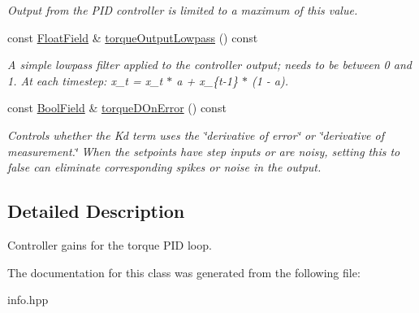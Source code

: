 \begin{DoxyCompactItemize}
\begin{DoxyCompactList}\small\item\em Output from the P\+ID controller is limited to a maximum of this value. \end{DoxyCompactList}\item 
const \hyperlink{classhebi_1_1Info_1_1FloatField}{Float\+Field} \& \hyperlink{classhebi_1_1Info_1_1Settings_1_1Actuator_1_1TorqueGains_ad1d43336c922f567cbb8f1d2f5e1b159}{torque\+Output\+Lowpass} () const \hypertarget{classhebi_1_1Info_1_1Settings_1_1Actuator_1_1TorqueGains_ad1d43336c922f567cbb8f1d2f5e1b159}{}\label{classhebi_1_1Info_1_1Settings_1_1Actuator_1_1TorqueGains_ad1d43336c922f567cbb8f1d2f5e1b159}

\begin{DoxyCompactList}\small\item\em A simple lowpass filter applied to the controller output; needs to be between 0 and 1. At each timestep\+: x\+\_\+t = x\+\_\+t $\ast$ a + x\+\_\+\{t-\/1\} $\ast$ (1 -\/ a). \end{DoxyCompactList}\item 
const \hyperlink{classhebi_1_1Info_1_1BoolField}{Bool\+Field} \& \hyperlink{classhebi_1_1Info_1_1Settings_1_1Actuator_1_1TorqueGains_ac07e4b48f29d33e6b48590c482013d3a}{torque\+D\+On\+Error} () const \hypertarget{classhebi_1_1Info_1_1Settings_1_1Actuator_1_1TorqueGains_ac07e4b48f29d33e6b48590c482013d3a}{}\label{classhebi_1_1Info_1_1Settings_1_1Actuator_1_1TorqueGains_ac07e4b48f29d33e6b48590c482013d3a}

\begin{DoxyCompactList}\small\item\em Controls whether the Kd term uses the \char`\"{}derivative of error\char`\"{} or \char`\"{}derivative of measurement.\char`\"{} When the setpoints have step inputs or are noisy, setting this to {\ttfamily false} can eliminate corresponding spikes or noise in the output. \end{DoxyCompactList}\end{DoxyCompactItemize}


\subsection{Detailed Description}
Controller gains for the torque P\+ID loop. 

The documentation for this class was generated from the following file\+:\begin{DoxyCompactItemize}
\item 
info.\+hpp\end{DoxyCompactItemize}
